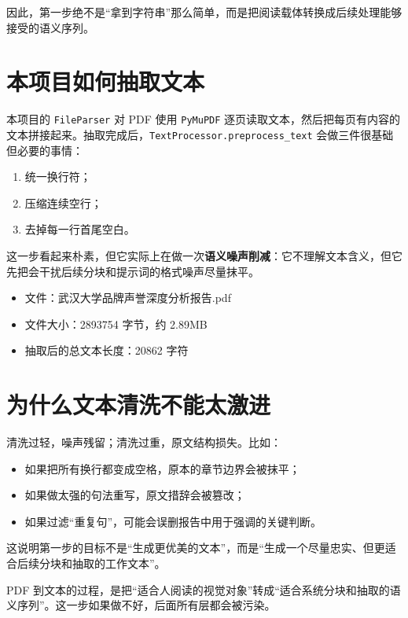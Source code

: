 \documentclass[UTF8,10pt,oneside]{ctexbook}
\newcommand{\code}[1]{\nolinkurl{#1}}
\begin{document}
因此，第一步绝不是“拿到字符串”那么简单，而是把阅读载体转换成后续处理能够接受的语义序列。

\section{本项目如何抽取文本}

本项目的 \code{FileParser} 对 PDF 使用 \code{PyMuPDF} 逐页读取文本，然后把每页有内容的文本拼接起来。抽取完成后，\code{TextProcessor.preprocess\_text} 会做三件很基础但必要的事情：

\begin{enumerate}
  \item 统一换行符；
  \item 压缩连续空行；
  \item 去掉每一行首尾空白。
\end{enumerate}

这一步看起来朴素，但它实际上在做一次\textbf{语义噪声削减}：它不理解文本含义，但它先把会干扰后续分块和提示词的格式噪声尽量抹平。

\begin{casebox}[本次案例中的真实输入]
\begin{itemize}
  \item 文件：武汉大学品牌声誉深度分析报告.pdf
  \item 文件大小：2893754 字节，约 2.89MB
  \item 抽取后的总文本长度：20862 字符
\end{itemize}
\end{casebox}

\section{为什么文本清洗不能太激进}

清洗过轻，噪声残留；清洗过重，原文结构损失。比如：

\begin{itemize}
  \item 如果把所有换行都变成空格，原本的章节边界会被抹平；
  \item 如果做太强的句法重写，原文措辞会被篡改；
  \item 如果过滤“重复句”，可能会误删报告中用于强调的关键判断。
\end{itemize}

这说明第一步的目标不是“生成更优美的文本”，而是“生成一个尽量忠实、但更适合后续分块和抽取的工作文本”。

\begin{takeawaybox}[本章核心结论]
PDF 到文本的过程，是把“适合人阅读的视觉对象”转成“适合系统分块和抽取的语义序列”。这一步如果做不好，后面所有层都会被污染。
\end{takeawaybox}
\end{document}
